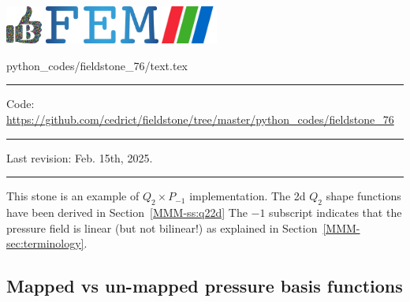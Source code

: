 \noindent
\includegraphics[height=1.25cm]{images/pictograms/benchmark}
\includegraphics[height=1.25cm]{images/pictograms/FEM}
\includegraphics[height=1.25cm]{images/pictograms/paraview}


\begin{flushright} {\tiny {\color{gray} python\_codes/fieldstone\_76/text.tex}} \end{flushright}


\par\noindent\rule{\textwidth}{0.4pt}

\begin{center}
\inpython
{\small Code: \url{https://github.com/cedrict/fieldstone/tree/master/python_codes/fieldstone_76}}
\end{center}


\par\noindent\rule{\textwidth}{0.4pt}

Last revision: Feb. 15th, 2025.

\par\noindent\rule{\textwidth}{0.4pt}



This stone is an example of $Q_2\times P_{-1}$ implementation. 
The 2d $Q_2$ shape functions have been derived in Section~\ref{MMM-ss:q22d}
The $-1$ subscript indicates that the pressure field is linear (but not bilinear!)
as explained in Section~\ref{MMM-sec:terminology}.

\subsection*{Mapped vs un-mapped pressure basis functions}

